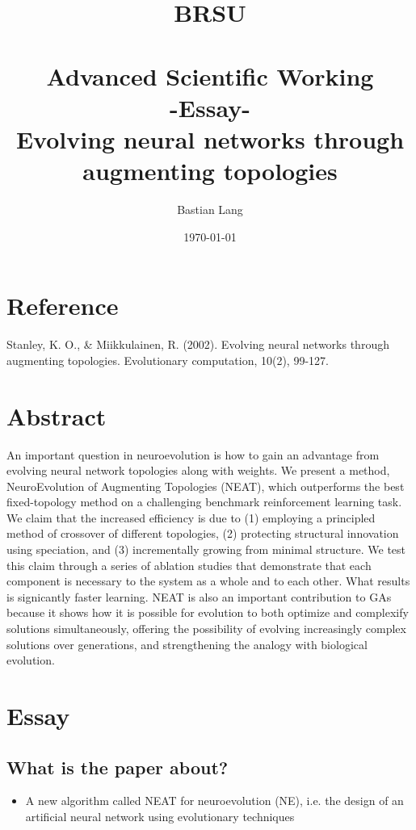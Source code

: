\documentclass[paper=a4, fontsize=11pt]{scrartcl} %
\title{	
\normalfont \normalsize 
\textsc{BRSU} \\ [25pt] %
\horrule{0.5pt} \\[0.4cm] %
\huge Advanced Scientific Working\\-Essay-\\
Evolving neural networks through augmenting topologies %
\horrule{2pt} \\[0.5cm] %
}
\author{Bastian Lang} %
\date{\normalsize\today} %
\numberwithin{equation}{section} %
\numberwithin{figure}{section} %
\numberwithin{table}{section} %
\begin{document}
\maketitle %

\newpage

\section{Reference}
Stanley, K. O., \& Miikkulainen, R. (2002). Evolving neural networks through augmenting topologies. Evolutionary computation, 10(2), 99-127.

\section{Abstract}
An important question in neuroevolution is how to gain an advantage from evolving neural network topologies along with weights. We present a method, NeuroEvolution of Augmenting Topologies (NEAT), which outperforms the best fixed-topology method on a challenging benchmark reinforcement learning task. We claim that the increased efficiency is due to (1) employing a principled method of crossover of different topologies, (2) protecting structural innovation using speciation, and (3) incrementally growing from minimal structure. We test this claim through a series of ablation studies that demonstrate that each component is necessary to the system as a whole and to each other. What results is signicantly faster learning. NEAT is also an important contribution to GAs because it shows how it is possible for evolution to both optimize and complexify solutions simultaneously, offering the possibility of evolving increasingly complex solutions over generations, and strengthening the analogy with biological evolution.


\section{Essay}
\subsection{What is the paper about?}
\begin{itemize}
	\item A new algorithm called NEAT for neuroevolution (NE), i.e. the design of an artificial neural network using evolutionary techniques
\end{itemize}
\end{document}
